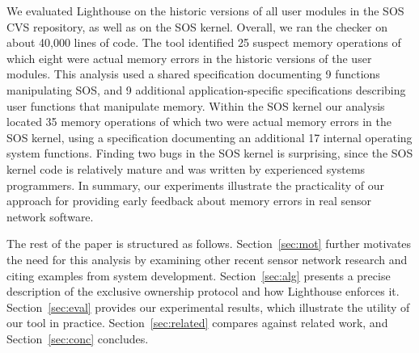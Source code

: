 We evaluated Lighthouse on the historic versions of all user modules in the
SOS CVS repository, as well as on the SOS kernel.  
%
Overall, we ran the checker on about 40,000 lines of code.  
%
The tool identified 25 suspect memory operations of which eight were actual
memory errors in the historic versions of the user modules.
%
This analysis used a shared specification documenting 9 functions
manipulating SOS, and 9 additional application-specific specifications
describing user functions that manipulate memory.
%
Within the SOS kernel our analysis located 35 memory operations of which two
were actual memory errors in the SOS kernel, using a specification
documenting an additional 17 internal operating system functions.  
%
Finding two bugs in the SOS kernel is surprising, since the SOS kernel code
is relatively mature and was written by experienced systems programmers.  
%
In summary, our experiments illustrate the practicality of our approach for
providing early feedback about memory errors in real sensor network
software.



The rest of the paper is structured as follows.  
%
Section~\ref{sec:mot} further motivates the need for this analysis by
examining other recent sensor network research and citing examples from
system development.
%
Section~\ref{sec:alg} presents a precise description of the exclusive
ownership protocol and how Lighthouse enforces it.  
%
Section~\ref{sec:eval} provides our experimental results, which illustrate
the utility of our tool in practice.  
%
Section~\ref{sec:related} compares against related work, and
Section~\ref{sec:conc} concludes.



